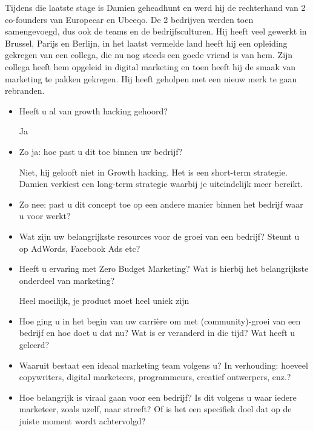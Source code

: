 Tijdens die laatste stage is Damien geheadhunt en werd hij de rechterhand van 2 co-founders van Europecar en Ubeeqo. De 2 bedrijven werden toen samengevoegd, dus ook de teams en de bedrijfsculturen. Hij heeft veel gewerkt in Brussel, Parijs en Berlijn, in het laatst vermelde land heeft hij een opleiding gekregen van een collega, die nu nog steeds een goede vriend is van hem. Zijn collega heeft hem opgeleid in digital marketing en toen heeft hij de smaak van marketing te pakken gekregen. Hij heeft geholpen met een nieuw merk te gaan rebranden.

\begin{itemize} 
	\item Heeft u al van growth hacking gehoord?
	
Ja
	
	\item Zo ja: hoe past u dit toe binnen uw bedrijf?
	
Niet, hij gelooft niet in Growth hacking. Het is een short-term strategie. Damien verkiest een long-term strategie waarbij je uiteindelijk meer bereikt.
	
	\item Zo nee: past u dit concept toe op een andere manier binnen het bedrijf waar u voor werkt?
	

	
	\item Wat zijn uw belangrijkste resources voor de groei van een bedrijf? Steunt u op AdWords, Facebook Ads etc?
	


	\item Heeft u ervaring met Zero Budget Marketing? Wat is hierbij het belangrijkste onderdeel van marketing?
	
Heel moeilijk, je product moet heel uniek zijn
	
	\item Hoe ging u in het begin van uw carrière om met (community)-groei van een bedrijf en hoe doet u dat nu? Wat is er veranderd in die tijd? Wat heeft u geleerd?
	

	
	\item Waaruit bestaat een ideaal marketing team volgens u? In verhouding: hoeveel copywriters, digital marketeers, programmeurs, creatief ontwerpers, enz.?
	
	
	
	\item Hoe belangrijk is viraal gaan voor een bedrijf? Is dit volgens u waar iedere marketeer, zoals uzelf, naar streeft? Of is het een specifiek doel dat op de juiste moment wordt achtervolgd?
	

\end{itemize}
